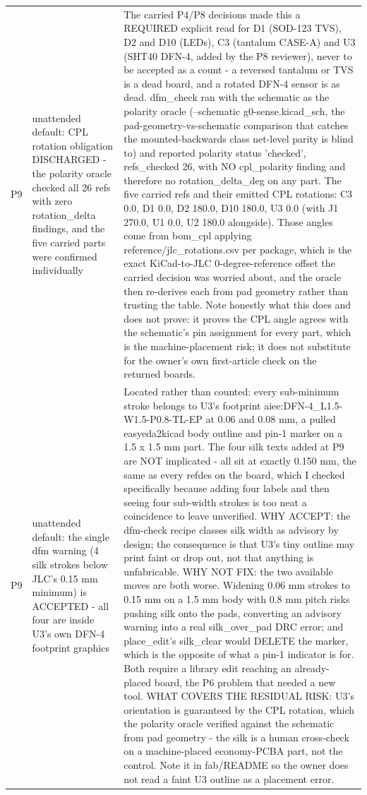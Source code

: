 \documentclass[11pt,a4paper]{article}
\begin{document}
{\begin{longtable}{lp{5.2cm}p{7.2cm}}
P9 & unattended default: CPL rotation obligation DISCHARGED - the polarity oracle checked all 26 refs with zero rotation\_delta findings, and the five carried parts were confirmed individually & The carried P4/P8 decisions made this a REQUIRED explicit read for D1 (SOD-123 TVS), D2 and D10 (LEDs), C3 (tantalum CASE-A) and U3 (SHT40 DFN-4, added by the P8 reviewer), never to be accepted as a count - a reversed tantalum or TVS is a dead board, and a rotated DFN-4 sensor is as dead. dfm\_check ran with the schematic as the polarity oracle (--schematic g0-sense.kicad\_sch, the pad-geometry-vs-schematic comparison that catches the mounted-backwards class net-level parity is blind to) and reported polarity status 'checked', refs\_checked 26, with NO cpl\_polarity finding and therefore no rotation\_delta\_deg on any part. The five carried refs and their emitted CPL rotations: C3 0.0, D1 0.0, D2 180.0, D10 180.0, U3 0.0 (with J1 270.0, U1 0.0, U2 180.0 alongside). Those angles come from bom\_cpl applying reference/jlc\_rotations.csv per package, which is the exact KiCad-to-JLC 0-degree-reference offset the carried decision was worried about, and the oracle then re-derives each from pad geometry rather than trusting the table. Note honestly what this does and does not prove: it proves the CPL angle agrees with the schematic's pin assignment for every part, which is the machine-placement risk; it does not substitute for the owner's own first-article check on the returned boards. \\
P9 & unattended default: the single dfm warning (4 silk strokes below JLC's 0.15 mm minimum) is ACCEPTED - all four are inside U3's own DFN-4 footprint graphics & Located rather than counted: every sub-minimum stroke belongs to U3's footprint aiee:DFN-4\_L1.5-W1.5-P0.8-TL-EP at 0.06 and 0.08 mm, a pulled easyeda2kicad body outline and pin-1 marker on a 1.5 x 1.5 mm part. The four silk texts added at P9 are NOT implicated - all sit at exactly 0.150 mm, the same as every refdes on the board, which I checked specifically because adding four labels and then seeing four sub-width strokes is too neat a coincidence to leave unverified. WHY ACCEPT: the dfm-check recipe classes silk width as advisory by design; the consequence is that U3's tiny outline may print faint or drop out, not that anything is unfabricable. WHY NOT FIX: the two available moves are both worse. Widening 0.06 mm strokes to 0.15 mm on a 1.5 mm body with 0.8 mm pitch risks pushing silk onto the pads, converting an advisory warning into a real silk\_over\_pad DRC error; and place\_edit's silk\_clear would DELETE the marker, which is the opposite of what a pin-1 indicator is for. Both require a library edit reaching an already-placed board, the P6 problem that needed a new tool. WHAT COVERS THE RESIDUAL RISK: U3's orientation is guaranteed by the CPL rotation, which the polarity oracle verified against the schematic from pad geometry - the silk is a human cross-check on a machine-placed economy-PCBA part, not the control. Note it in fab/README so the owner does not read a faint U3 outline as a placement error. \\

\end{longtable}}
\end{document}
